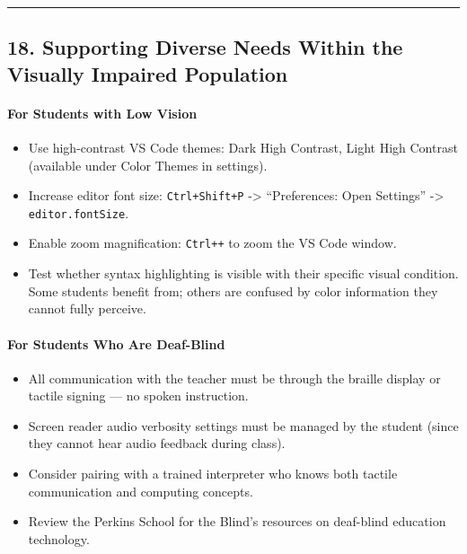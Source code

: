 \documentclass[
  justified,
  openright,
]{tufte-book}
\let\subsubsection\paragraph
\let\paragraph\paragraph
\let\subsubsection\paragraph
\let\paragraph\paragraph
\providecommand{\tightlist}{%
  \setlength{\itemsep}{0pt}\setlength{\parskip}{0pt}}
\begin{document}
\begin{center}\rule{0.5\linewidth}{0.5pt}\end{center}

\subsection{18. Supporting Diverse Needs Within the Visually Impaired
Population}\label{supporting-diverse-needs-within-the-visually-impaired-population}

\subsubsection{For Students with Low
Vision}\label{for-students-with-low-vision}

\begin{itemize}
\tightlist
\item
  Use high-contrast VS Code themes: Dark High Contrast, Light High
  Contrast (available under Color Themes in settings).
\item
  Increase editor font size: \texttt{Ctrl+Shift+P} -\textgreater{}
  ``Preferences: Open Settings'' -\textgreater{}
  \texttt{editor.fontSize}.
\item
  Enable zoom magnification: \texttt{Ctrl++} to zoom the VS Code window.
\item
  Test whether syntax highlighting is visible with their specific visual
  condition. Some students benefit from; others are confused by color
  information they cannot fully perceive.
\end{itemize}

\subsubsection{For Students Who Are
Deaf-Blind}\label{for-students-who-are-deaf-blind}

\begin{itemize}
\tightlist
\item
  All communication with the teacher must be through the braille display
  or tactile signing --- no spoken instruction.
\item
  Screen reader audio verbosity settings must be managed by the student
  (since they cannot hear audio feedback during class).
\item
  Consider pairing with a trained interpreter who knows both tactile
  communication and computing concepts.
\item
  Review the Perkins School for the Blind's resources on deaf-blind
  education technology.
\end{itemize}
\end{document}
